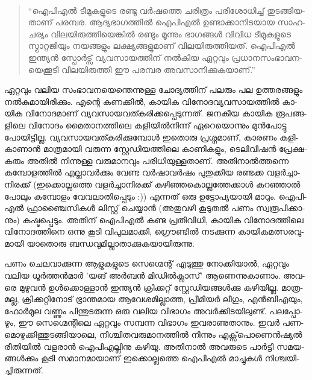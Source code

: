 \vskip 2pt

‌\begin{quotation}
``ഐ­പി­എല്‍ ടീ­മു­ക­ളു­ടെ രണ്ടു വര്‍­ഷ­ത്തെ ചരി­ത്രം പരി­ശോ­ധി­ച്ച് തു­ട­ങ്ങി­യ­താ­ണ് പര­മ്പ­ര. ആദ്യഭാഗത്തില്‍ ഐ­പി­എല്‍ 
ഉണ്ടാ­ക്കാ­നി­ട­യായ സാ­ഹ­ച­ര്യം വി­ല­യി­രു­ത്തി­യെ­ങ്കില്‍ രണ്ടും മൂന്നും ഭാ­ഗ­ങ്ങള്‍ വി­വിധ ടീ­മു­ക­ളു­ടെ സ്ട്രാ­റ്റ­ജി­യും നയ­ങ്ങ­ളും 
ലക്ഷ്യ­ങ്ങ­ളു­മാ­ണ് വി­ല­യി­രു­ത്തി­യ­ത്. ഐപി­എല്‍ ഇന്ത്യന്‍ സ്പോര്‍­ട്സ് വ്യ­വ­സാ­യ­ത്തി­ന് നല്‍­കിയ ഏറ്റ­വും 
പ്ര­ധാ­ന­സം­ഭാ­വ­ന­യെ­ക്കൂ­ടി വി­ല­യി­രു­ത്തി ഈ ­പ­ര­മ്പ­ര അവ­സാ­നി­ക്കു­ക­യാ­ണ്.''
\end{quotation}

{\vskip 12pt}

ഏ­റ്റ­വും വലിയ സം­ഭാ­വ­ന­യെ­ന്തെ­ന്നു­ള്ള ചോ­ദ്യ­ത്തി­ന് പല­രും പല ഉത്ത­ര­ങ്ങ­ളും നല്‍­കു­മാ­യി­രി­ക്കും. എന്റെ കണ­ക്കില്‍, 
കാ­യിക വി­നോ­ദ­വ്യ­വ­സാ­യ­ത്തില്‍ കാ­യിക വി­നോ­ദ­മാ­ണ് വ്യ­വ­സാ­യ­വ­ത്ക­രി­ക്ക­പ്പെ­ടു­ന്ന­ത്. ജന­കീയ കാ­യിക രൂ­പ­ങ്ങ­ളി­ലെ 
­വി­നോ­ദം­ മൈ­താ­ന­ത്തി­ലെ കളി­യില്‍­നി­ന്ന് ഏറെ­യൊ­ന്നും മുന്‍­പോ­ട്ടു പോ­യി­ട്ടി­ല്ല. വ്യ­വ­സാ­യ­വ­ത്ക­രി­ക്കു­മ്പോള്‍ ഇതൊ­രു 
പ്ര­ശ്ന­മാ­ണ്, കാ­ര­ണം കളി­കാ­ണാന്‍ മാ­ത്ര­മാ­യി വരു­ന്ന സ്റ്റേ­ഡി­യ­ത്തി­ലെ കാ­ണി­ക­ളും, ­ടെ­ലി­വി­ഷന്‍ പ്രേ­ക്ഷ­ക­രും അതില്‍ 
നി­ന്നു­ള്ള വരു­മാ­ന­വും പരി­ധി­യു­ള്ള­താ­ണ്. അതി­നാല്‍­ത്ത­ന്നെ കമ്പോ­ള­ത്തില്‍ എല്ലാ­വര്‍­ക്കും വേ­ണ്ട വര്‍­ഷാ­വര്‍­ഷം പു­തു­ക്കിയ 
രണ്ട­ക്ക വളര്‍­ച്ചാ­നി­ര­ക്ക് (ഇ­ക്കൊ­ല്ല­ത്തെ വളര്‍­ച്ചാ­നി­ര­ക്ക് കഴി­ഞ്ഞ­കൊ­ല്ല­ത്തേ­ക്കാള്‍ കു­റ­ഞ്ഞാല്‍ പോ­ലും കമ്പോ­ളം 
വേ­വ­ലാ­തി­പ്പെ­ടും :)) എന്ന­ത് ഒരു ഉട്ടോ­പ്യ­യാ­യി മാ­റും. ഐപി­എല്‍ ഫ്രാ­ഞ്ചൈ­സി­കള്‍ ലി­സ്റ്റ് ചെ­യ്യാന്‍ (അ­തു­വ­ഴി കൂ­ടു­തല്‍ 
പണം സ്വ­രൂ­പി­ക്കാ­നും) കഷ്ട­പ്പെ­ടും. അതി­ന് ഐപി­എല്‍ കണ്ട പ്ര­തി­വി­ധി, കാ­യിക വി­നോ­ദ­ത്തി­ലെ വി­നോ­ദ­ത്തി­നെ ഒന്നു 
കൂ­ടി വി­പു­ല­മാ­ക്കി, ഗ്രൌ­ണ്ടില്‍ നട­ക്കു­ന്ന കാ­യി­ക­മ­ത്സ­ര­വു­മാ­യി യാ­തൊ­രു ബന്ധ­വു­മി­ല്ലാ­താ­ക്കു­ക­യാ­യി­രു­ന്നു­.

­പ­ണം ചെ­ല­വാ­ക്കു­ന്ന ആളു­ക­ളു­ടെ സെ­ഗ്മെ­ന്റ് എടു­ത്തു നോ­ക്കി­യാല്‍, ഏറ്റ­വും വലിയ ധൂര്‍­ത്തന്‍­മാര്‍ 'യ­ങ് അര്‍­ബന്‍ 
മി­ഡില്‍­ക്ലാ­സ്' ആണെ­ന്നു­കാ­ണാം. അവ­രെ മു­ഴു­വന്‍ ഉള്‍­ക്കൊ­ള്ളാന്‍ ഇന്ത്യന്‍ ­ക്രി­ക്ക­റ്റ് സ്റ്റേ­ഡി­യ­ങ്ങള്‍­ക്കു കഴി­യി­ല്ല. മാ­ത്ര­മ­ല്ല, 
ക്രി­ക്ക­റ്റി­നോ­ട് ഭ്രാ­ന്ത­മായ ആവേ­ശ­മി­ല്ലാ­ത്ത, പ്രീ­മി­യര്‍ ലീ­ഗും, എന്‍­ബി­എ­യും, ഫോര്‍­മുല വണ്ണും പി­ന്തു­ട­രു­ന്ന ഒരു വലിയ വി­ഭാ­ഗം 
അവര്‍­ക്കി­ട­യി­ലു­ണ്ട്. പല­പ്പോ­ഴും, ഈ സെ­ഗ്മെ­ന്റി­ലെ ഏറ്റ­വും സമ്പ­ന്ന വി­ഭാ­ഗം ഇവ­രാ­ണു­താ­നും. ഇവര്‍ 
പണ­മൊ­ഴു­ക്കി­ത്തു­ട­ങ്ങി­യാ­ലെ, നി­ശ്ചി­ത­വ­രു­മാ­ന­ത്തില്‍ നി­ന്നും എക്സ്‌­പൊ­ണെന്‍­ഷ്യല്‍ രീ­തി­യില്‍ വള­രാന്‍ ഐപി­എ­ല്ലി­നു 
കഴി­യൂ. അതി­നാല്‍ അവ­രു­ടെ ­പാര്‍­ട്ടി­ സമ­യ­ങ്ങള്‍­ക്കും കൂ­ടി സമാ­ന­മാ­യാ­ണ് ഇക്കൊ­ല്ല­ത്തെ ഐപി­എല്‍ മാ­ച്ചു­കള്‍ 
നി­ശ്ച­യി­ച്ചി­രു­ന്ന­ത്.

